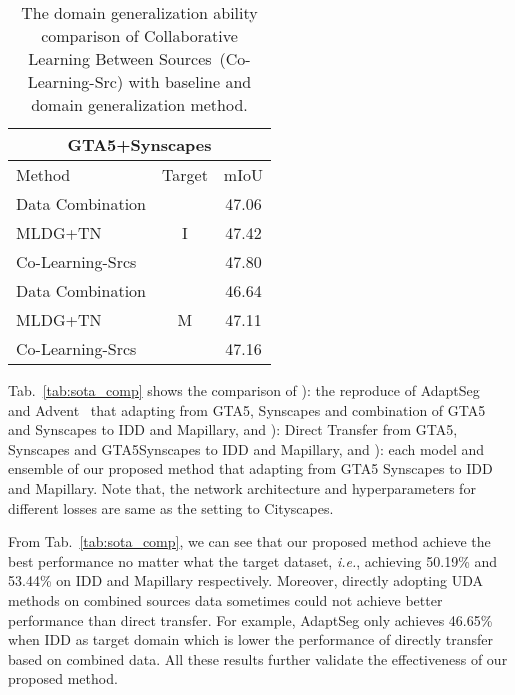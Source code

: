 \documentclass[final]{cvpr}
\def\ie{\textit{i.e.}}
\begin{document}
\begin{table}[t]
	\centering
	\caption{The domain generalization ability comparison of Collaborative Learning Between Sources~(Co-Learning-Src) with baseline and domain generalization method.}
	\label{Tab:DG_comp}
	\setlength{\tabcolsep}{5mm}
	\begin{tabular}{l|c|c}
		\hline
		\multicolumn{3}{c}{GTA5+Synscapes} \\
		\hline
		Method & Target & mIoU \\
		\hline
		Data Combination & \multirow{3}{*}{I} &  47.06\\
		MLDG+TN~\cite{zhang2020generalizable} & & 47.42\\
		Co-Learning-Srcs & & 47.80\\
		\hline
		Data Combination & \multirow{3}{*}{M} & 46.64\\
		MLDG+TN~\cite{zhang2020generalizable} & & 47.11\\
		Co-Learning-Srcs & & 47.16 \\
		\hline
	\end{tabular}
\end{table}

Tab.~\ref{tab:sota_comp} shows the comparison of ): the reproduce of AdaptSeg~\cite{tsai2018learning} and Advent~\cite{vu2019advent} that adapting from GTA5, Synscapes and combination of GTA5 and Synscapes to IDD and Mapillary, and ): Direct Transfer from GTA5, Synscapes and GTA5Synscapes to IDD and Mapillary, and ): each model and ensemble of our proposed method that adapting from GTA5  Synscapes to IDD and Mapillary. Note that, the network architecture and hyperparameters for different losses are same as the setting to Cityscapes. 

From Tab.~\ref{tab:sota_comp}, we can see that our proposed method achieve the best performance no matter what the target dataset, \ie, achieving 50.19\% and 53.44\% on IDD and Mapillary respectively. Moreover, directly adopting UDA methods on combined sources data sometimes could not achieve better performance than direct transfer. For example, AdaptSeg only achieves 46.65\% when IDD as target domain which is lower the performance of directly transfer based on combined data. All these results further validate the effectiveness of our proposed method.
\end{document}
